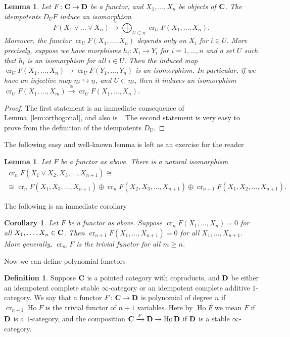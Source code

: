\documentclass[psamsfonts]{amsart}
\theoremstyle{plain}
\newtheorem{cor}[thm]{Corollary}
\newtheorem{lem}[thm]{Lemma}
\theoremstyle{definition}
\newtheorem{defn}[thm]{Definition}
\theoremstyle{remark}
\newcommand{\catname}[1]{{\normalfont\textbf{#1}}}
\DeclareMathOperator{\ce}{cr}
\DeclareMathOperator{\ho}{Ho}
\begin{document}
\begin{lem}\label{lemma:split}
Let $F\colon \catname{C}\to \catname{D}$ be a functor, and $X_1, \ldots, X_n$ be objects of $\catname{C}$. The idempotents $D_UF$ induce an isomorphism
\[
F(X_1\vee\ldots\vee X_n)\xrightarrow{\cong} \bigoplus_{U\subset\underline{n}} \ce_UF(X_1, \ldots, X_n).
\]
Moreover, the functor $\ce_UF(X_1, \ldots, X_n)$ depends only on $X_i$ for $i\in U$. More precisely, suppose we have morphisms $h_i\colon X_i\to Y_i$ for $i=1, \ldots, n$ and a set $U$ such that $h_i$ is an isomorphism for all $i\in U$. Then the induced map
$\ce_UF(X_1, \ldots, X_n)\to \ce_UF(Y_1, \ldots, Y_n)$ is an isomorphism. In particular, if we have an injective map  $\underline{m}\hookrightarrow\underline{n}$, and $U\subset \underline{m}$, then it induces an isomorphism $\ce_UF(X_1, \ldots, X_m)\xrightarrow{\cong} \ce_UF(X_1, \ldots, X_n)$. 
\end{lem}
\begin{proof}
The first statement is an immediate consequence of Lemma~\ref{lem:orthogonal}, and also is~\cite[Theorem 9.1]{Eilenberg1954}. The second statement is very easy to prove from the definition of the idempotents $D_U$.
\end{proof} 
The following easy and well-known lemma is left as an exercise for the reader
\begin{lem}
Let $F$ be a functor as above. There is a natural isomorphism
\begin{multline*}
\ce_nF(X_1\vee X_2, X_3, \ldots, X_{n+1})\cong \\ \cong\ce_nF(X_1, X_3, \ldots, X_{n+1}) \oplus \ce_nF(X_2, X_3, \ldots, X_{n+1}) \oplus \ce_{n+1}F(X_1, X_2, \ldots, X_{n+1}).
\end{multline*}
\end{lem}
The following is an immediate corollary
\begin{cor}\label{cor:implies}
Let $F$ be a functor as above. Suppose $\ce_nF(X_1, \ldots, X_n)=0$ for all $X_1, \ldots, X_n\in \catname{C}$. Then $\ce_{n+1}F(X_1, \ldots, X_{n+1})=0$ for all $X_1, \ldots, X_{n+1}$. More generally, $\ce_mF$ is the trivial functor for all $m\ge n$.
\end{cor}
Now we can define polynomial functors
\begin{defn}\label{def: polynomial}
Suppose $\catname{C}$ is a pointed category with coproducts, and $\catname{D}$ be either an idempotent complete stable $\infty$-category or an idempotent complete additive $1$-category. We say that a functor $F\colon \catname{C}\to \catname{D}$ is polynomial of degree $n$ if $\ce_{n+1}\ho F$ is the trivial functor of $n+1$ variables. Here by $\ho F$ we mean $F$ if $\catname{D}$ is a $1$-category, and the composition $\catname{C}\xrightarrow{F} \catname{D} \to \ho\catname{D}$ if $\catname{D}$ is a stable $\infty$-category.
\end{defn}
\end{document}
